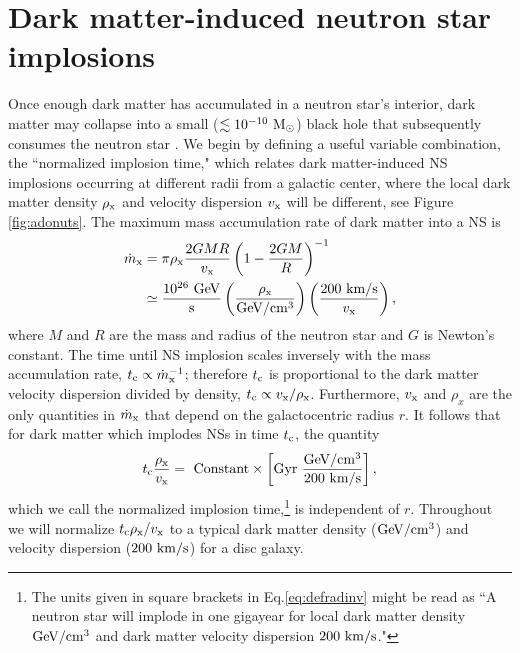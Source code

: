 \documentclass[nofootinbib,longbibliography,prd,floatfix,superscriptaddress,twocolumn]{revtex4-1}
\begin{document}
\section{Dark matter-induced neutron star implosions}  
\label{sec:dmNSimp}
Once enough dark matter has accumulated in a neutron star's interior, dark matter may collapse into a small ($\lesssim 10^{-10}~ {\rm M_{ \odot}}$) black hole that subsequently consumes the neutron star \cite{Bramante:2014zca,Goldman:1989nd,Bramante:2016mzo}. We begin by defining a useful variable combination, the ``normalized implosion time," which relates dark matter-induced NS implosions occurring at different radii from a galactic center, where the local dark matter density $\rho_{\rm x}$ and velocity dispersion $v_{\rm x}$ will be different, see Figure \ref{fig:adonuts}. The maximum mass accumulation rate of dark matter into a NS is \cite{Baryakhtar:2017dbj}
\begin{align}
 \dot{m}_{\rm x} &= \pi \rho_{\rm x} \frac{2G M R}{v_{\rm x}} \left(1- \frac{2 G M}{R} \right)^{-1} \nonumber \\ &\simeq {\rm \frac{10^{26}~GeV}{s}} \left(\frac{\rho_{\rm x}}{\rm GeV/cm^3} \right) \left(\frac{\rm 200~km/s}{v_{\rm x}} \right),
\end{align} 
where $M$ and $R$ are the mass and radius of the neutron star and $G$ is Newton's constant. The time until NS implosion scales inversely with the mass accumulation rate, $t_{\rm c} \propto \dot{m}_{\rm x}^{-1}$; therefore $t_{\rm c}$ is proportional to the dark matter velocity dispersion divided by density, $t_{\rm c} \propto  v_{\rm x} / \rho_{\rm x} $. Furthermore, $v_{\rm x}$  and $\rho_{x}$ are the only quantities in $\dot{m}_{\rm x}$ that depend on the galactocentric radius $r$. It follows that for dark matter which implodes NSs in time $t_{\rm c}$, the quantity
\begin{align}
t_{\rm c} \frac{\rho_{\rm x}}{v_{\rm x} } = {~\rm Constant} \times \left[{\rm Gyr} ~\frac{\rm GeV/cm^{3}}{\rm 200~ km/s} \right],
\label{eq:defradinv}
\end{align}
which we call the normalized implosion time,\footnote{The units given in square brackets in  Eq.\eqref{eq:defradinv} might be read as ``A neutron star will implode in one gigayear for local dark matter density ${\rm GeV/cm^3}$ and dark matter velocity dispersion $200 \rm ~km/s$."} is independent of $r$. Throughout we will normalize $t_{\rm c} \rho_{\rm x} /v_{\rm x} $ to a typical dark matter density ($\rm GeV/cm^3$) and velocity dispersion ($\rm 200~km/s$) for a disc galaxy. 
\end{document}
